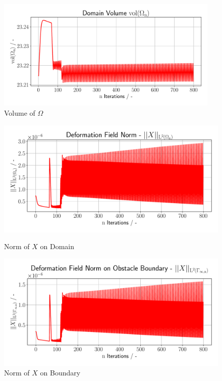 \begin{figure}
    \begin{center}
        \includegraphics[width=0.95\textwidth]{figures/volume_plot.pdf}
        \caption{Volume of $\Omega$}
        \label{plot_ref_volume}
    \end{center}
\end{figure}

\begin{figure}
    \begin{minipage}{.5\textwidth}
        \centering
        \includegraphics[width=1\textwidth]{figures/gfxnorm_plot.pdf}
        \caption{Norm of $X$ on Domain}
        \label{plot_ref_norm}
    \end{minipage}
    \begin{minipage}{.5\textwidth}
        \centering
        \includegraphics[width=1\textwidth]{figures/gfx_bndnorm_plot.pdf}
        \caption{Norm of $X$ on Boundary}
        \label{plot_ref_bndnorm}
    \end{minipage}
    \end{figure}